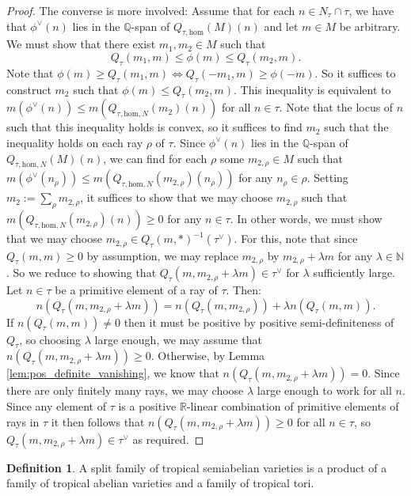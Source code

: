 \documentclass[11pt]{amsart}
\theoremstyle{definition}
\newtheorem{definition}[theorem]{Definition}
\theoremstyle{remark}
\def\hom{\mathrm{hom}}
\begin{document}
\begin{proof}
	The converse is more involved: Assume that for each $n\in N_{\tau}\cap \tau$, we have that
	$\phi^{\vee}(n)$ lies in the $\mathbb{Q}$-span of $Q_{\tau,\hom}(M)(n)$
	and let $m\in M$ be arbitrary. We must show that there exist $m_1,m_2\in M$ such that
	$$Q_{\tau}(m_1,m)\le \phi(m)\le Q_{\tau}(m_2,m).$$
	Note that $\phi(m)\ge Q_{\tau}(m_1,m)\Leftrightarrow Q_{\tau}(-m_1,m)\ge \phi(-m)$. So it suffices to construct $m_2$
	such that $\phi(m)\le Q_{\tau}(m_2,m)$. This inequality is equivalent to $m(\phi^{\vee}(n))\le m(Q_{\tau,\hom,N}(m_2)(n))$
	for all $n\in \tau$. Note that the locus of $n$ such that this inequality holds is convex, so it suffices to find $m_2$
	such that the inequality holds on each ray $\rho$ of $\tau$. Since $\phi^{\vee}(n)$ lies in the $\mathbb{Q}$-span of $Q_{\tau,\hom,N}(M)(n)$,
	we can find for each $\rho$ some $m_{2,\rho}\in M$ such that $m(\phi^{\vee}(n_{\rho}))\le m(Q_{\tau,\hom,N}(m_{2,\rho})(n_{\rho}))$
	for any $n_{\rho}\in \rho$. Setting $m_2:=\sum_{\rho}^{}m_{2,\rho}$, it suffices to show that we may choose $m_{2,\rho}$ such that $m(Q_{\tau,\hom,N}(m_{2,\rho})(n))\ge 0$
	for any $n\in \tau$. In other words, we must show that we may choose $m_{2,\rho}\in Q_{\tau}(m,\ast)^{-1}(\tau^{\vee})$. For
	this, note that since $Q_{\tau}(m,m)\ge 0$ by assumption, we may replace $m_{2,\rho}$ by $m_{2,\rho}+\lambda m$ for any $\lambda\in \mathbb{N}$.
	So we reduce to showing that $Q_{\tau}(m,m_{2,\rho}+\lambda m)\in \tau^{\vee}$ for $\lambda$ sufficiently large. Let $n\in \tau$
	be a primitive element of a ray of $\tau$. Then:
	$$n(Q_{\tau}(m,m_{2,\rho}+\lambda m))=n(Q_{\tau}(m,m_{2,\rho}))+\lambda n(Q_{\tau}(m,m)).$$
	If $n(Q_{\tau}(m,m))\neq 0$ then it must be positive by positive semi-definiteness of $Q_{\tau}$, so choosing $\lambda$
	large enough, we may assume that $n(Q_{\tau}(m,m_{2,\rho}+\lambda m))\ge 0$. Otherwise, by Lemma \ref{lem:pos_definite_vanishing},
	we know that $n(Q_{\tau}(m,m_{2,\rho}+\lambda m))=0$. Since there are only finitely many rays, we may choose $\lambda$ large
	enough to work for all $n$. Since any element of $\tau$ is a positive $\mathbb{R}$-linear combination of primitive elements of rays in $\tau$
	it then follows that $n(Q_{\tau}(m,m_{2,\rho}+\lambda m))\ge 0$ for all $n\in \tau$, so $Q_{\tau}(m,m_{2,\rho}+\lambda m)\in \tau^{\vee}$
	as required.
\end{proof}

\begin{definition}
	\label{def:trop_semiab}
	A split family of tropical semiabelian varieties is a product of a family of tropical abelian varieties and a family
	of tropical tori.
\end{definition}
\end{document}
